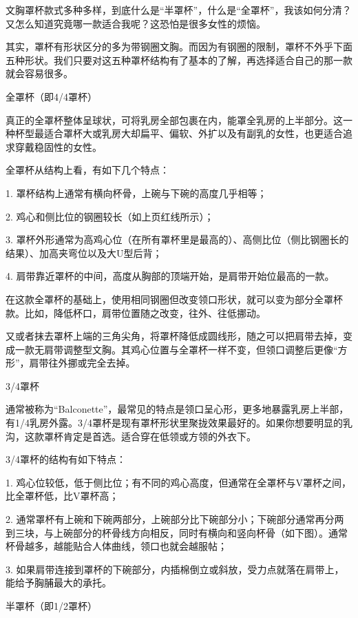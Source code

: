 \documentclass[12pt,UTF8]{ctexbook}
\begin{document}
文胸罩杯款式多种多样，到底什么是“半罩杯”，什么是“全罩杯”，我该如何分清？又怎么知道究竟哪一款适合我呢？这恐怕是很多女性的烦恼。

其实，罩杯有形状区分的多为带钢圈文胸。而因为有钢圈的限制，罩杯不外乎下面五种形状。我们只要对这五种罩杯结构有了基本的了解，再选择适合自己的那一款就会容易很多。

全罩杯（即4/4罩杯）

真正的全罩杯整体呈球状，可将乳房全部包裹在内，能罩全乳房的上半部分。这一种杯型最适合罩杯大或乳房大却扁平、偏软、外扩以及有副乳的女性，也更适合追求穿戴稳固性的女性。


全罩杯从结构上看，有如下几个特点：

1. 罩杯结构上通常有横向杯骨，上碗与下碗的高度几乎相等；



2. 鸡心和侧比位的钢圈较长（如上页红线所示）；

3. 罩杯外形通常为高鸡心位（在所有罩杯里是最高的）、高侧比位（侧比钢圈长的结果）、加高夹弯位以及大U型后背；

4. 肩带靠近罩杯的中间，高度从胸部的顶端开始，是肩带开始位最高的一款。


在这款全罩杯的基础上，使用相同钢圈但改变领口形状，就可以变为部分全罩杯款。比如，降低杯口，肩带位置随之改变，往外、往低挪动。



又或者抹去罩杯上端的三角尖角，将罩杯降低成圆线形，随之可以把肩带去掉，变成一款无肩带调整型文胸。其鸡心位置与全罩杯一样不变，但领口调整后更像“方形”，肩带往外挪或完全去掉。



3/4罩杯

通常被称为“Balconette”，最常见的特点是领口呈心形，更多地暴露乳房上半部，有1/4乳房外露。3/4罩杯是现有罩杯形状里聚拢效果最好的。如果你想要明显的乳沟，这款罩杯肯定是首选。适合穿在低领或方领的外衣下。


3/4罩杯的结构有如下特点：

1. 鸡心位较低，低于侧比位；有不同的鸡心高度，但通常在全罩杯与V罩杯之间，比全罩杯低，比V罩杯高；

2. 通常罩杯有上碗和下碗两部分，上碗部分比下碗部分小；下碗部分通常再分两到三块，与上碗部分的杯骨线方向相反，同时有横向和竖向杯骨（如下图）。通常杯骨越多，越能贴合人体曲线，领口也就会越服帖；

3. 如果肩带连接到罩杯的下碗部分，内插棉倒立或斜放，受力点就落在肩带上，能给予胸脯最大的承托。



半罩杯（即1/2罩杯）
\end{document}
